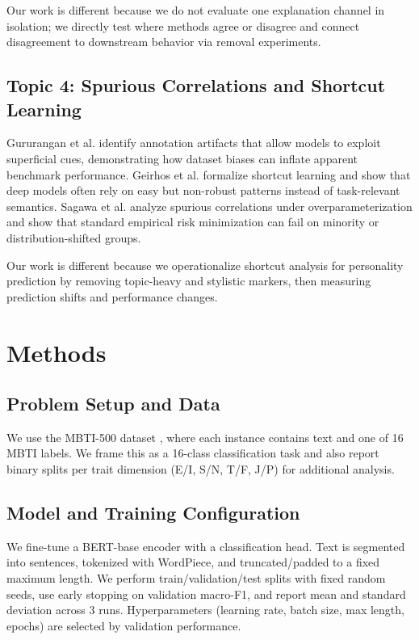 \documentclass[sigplan,screen]{acmart}
\begin{document}
Our work is different because we do not evaluate one explanation channel in isolation; we directly test where methods agree or disagree and connect disagreement to downstream behavior via removal experiments.

\subsection{Topic 4: Spurious Correlations and Shortcut Learning}
Gururangan et al. \cite{gururangan2018annotation} identify annotation artifacts that allow models to exploit superficial cues, demonstrating how dataset biases can inflate apparent benchmark performance. Geirhos et al. \cite{geirhos2020shortcut} formalize shortcut learning and show that deep models often rely on easy but non-robust patterns instead of task-relevant semantics. Sagawa et al. \cite{sagawa2020investigation} analyze spurious correlations under overparameterization and show that standard empirical risk minimization can fail on minority or distribution-shifted groups.

Our work is different because we operationalize shortcut analysis for personality prediction by removing topic-heavy and stylistic markers, then measuring prediction shifts and performance changes.

\section{Methods}
\subsection{Problem Setup and Data}
We use the MBTI-500 dataset \cite{mbti500_kaggle}, where each instance contains text and one of 16 MBTI labels. We frame this as a 16-class classification task and also report binary splits per trait dimension (E/I, S/N, T/F, J/P) for additional analysis.

\subsection{Model and Training Configuration}
We fine-tune a BERT-base encoder \cite{devlin2019bert} with a classification head. Text is segmented into sentences, tokenized with WordPiece, and truncated/padded to a fixed maximum length. We perform train/validation/test splits with fixed random seeds, use early stopping on validation macro-F1, and report mean and standard deviation across 3 runs. Hyperparameters (learning rate, batch size, max length, epochs) are selected by validation performance.
\end{document}
